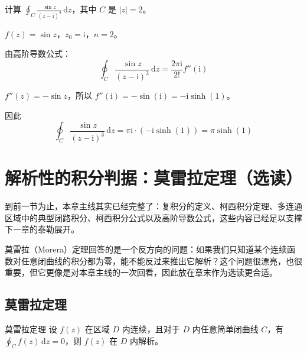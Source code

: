 \begin{lizi}{}{}
计算 $\displaystyle\oint_C \frac{\sin z}{(z - \mathrm{i})^3}\,\mathrm{d}z$，其中 $C$ 是 $|z| = 2$。

\begin{jie}
    $f(z) = \sin z$，$z_0 = \mathrm{i}$，$n = 2$。
    
    由高阶导数公式：
    \begin{equation}
        \oint_C \frac{\sin z}{(z - \mathrm{i})^3}\,\mathrm{d}z = \frac{2\pi\mathrm{i}}{2!} f''(\mathrm{i})
    \end{equation}
    
    $f''(z) = -\sin z$，所以 $f''(\mathrm{i}) = -\sin(\mathrm{i}) = -\mathrm{i}\sinh(1)$。
    
    因此
    \begin{equation}
        \oint_C \frac{\sin z}{(z - \mathrm{i})^3}\,\mathrm{d}z = \pi\mathrm{i} \cdot (-\mathrm{i}\sinh(1)) = \pi\sinh(1)
    \end{equation}
\end{jie}
\end{lizi}

\section{解析性的积分判据：莫雷拉定理（选读）}

\begin{wulibj}[为什么把莫雷拉定理放在章末]
到前一节为止，本章主线其实已经完整了：复积分的定义、柯西积分定理、多连通区域中的典型闭路积分、柯西积分公式以及高阶导数公式，这些内容已经足以支撑下一章的泰勒展开。

莫雷拉（Morera）定理回答的是一个反方向的问题：如果我们只知道某个连续函数对任意闭曲线的积分都为零，能不能反过来推出它解析？这个问题很漂亮，也很重要，但它更像是对本章主线的一次回看，因此放在章末作为选读更合适。
\end{wulibj}

\subsection{莫雷拉定理}

\begin{dingli}{莫雷拉定理}{}
设 $f(z)$ 在区域 $D$ 内连续，且对于 $D$ 内任意简单闭曲线 $C$，有 $\oint_C f(z)\,\mathrm{d}z = 0$，则 $f(z)$ 在 $D$ 内解析。
\end{dingli}

